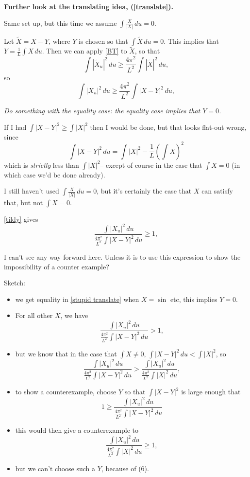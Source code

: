 \documentclass{amsart}
\begin{document}
\textbf{Further look at the translating idea, (\ref{translate}).}

Same set up, but this time we assume $\int \frac{X}{|X|}\,du=0$. 

Let $\tilde{X}=X-Y$, where $Y$ is chosen so that $\int\tilde{X}\, du=0$.    This implies that $Y=\frac1L\int X \,du$.    Then we can apply \eqref{BT} to $\tilde{X}$, so that 
\[  \int |\tilde{X}_u|^2 \,du \ge \frac{4\pi^2}{L^2}\int |\tilde{X}|^2\,du , \]
so
\begin{equation} \int |{X}_u|^2 \,du \ge \frac{4\pi^2}{L^2}\int |{X}-Y|^2\,du , \label{tildy}\end{equation}

\emph{Do something with the equality case:  the equality case implies that $Y=0$.}

If I had $\int|X-Y|^2\ge\int|X|^2$ then I would be done, but that looks flat-out wrong, since 
\[\int |X-Y|^2 \, du = \int |X|^2- \frac1L\left(\int X\right)^2\]
which is \emph{strictly} less than $\int |X|^2$-- except of course in the case that $\int X=0$ (in which case we'd be done already).   

I still haven't used $\int \frac{X}{|X|}\,du=0$, but it's certainly the case that $X$ can satisfy that, but not $\int X=0$.  

\eqref{tildy} gives 
\begin{equation}\frac{ \int |{X}_u|^2 \,du}{ \frac{4\pi^2}{L^2}\int |{X}-Y|^2\,du }\ge 1, \label{stupid translate} \end{equation}

I can't see any way forward here.   Unless it is to use this expression to show the impossibility of a counter example?

Sketch:   \begin{itemize}
\item we get equality in \eqref{stupid translate} when $X=\sin $ etc, this implies $Y=0$. 
\item For all other $X$, we have
\begin{equation}\frac{ \int |{X}_u|^2 \,du}{ \frac{4\pi^2}{L^2}\int |{X}-Y|^2\,du }> 1,  \end{equation}
\item but we know that in the case that $\int X\not=0$, $\int |{X}-Y|^2\,du < \int |X|^2$, so 
\begin{equation}
\frac{ \int |{X}_u|^2 \,du}{ \frac{4\pi^2}{L^2}\int |{X}-Y|^2\,du }> \frac{ \int |{X}_u|^2 \,du}{ \frac{4\pi^2}{L^2}\int |{X}|^2\,du },  \end{equation}
\item to show a counterexample, choose $Y$ so that $\int |X-Y|^2$ is large enough that 
\[1\ge \frac{ \int |{X}_u|^2 \,du}{ \frac{4\pi^2}{L^2}\int |{X}-Y|^2\,du }\]
\item this would then give a counterexample to 
\begin{equation}\frac{ \int |{X}_u|^2 \,du}{ \frac{4\pi^2}{L^2}\int |{X}|^2\,du }\ge 1,  \end{equation}
\item but we can't choose such a $Y$, because of (6).
\end{itemize}
\bigskip
\end{document}
